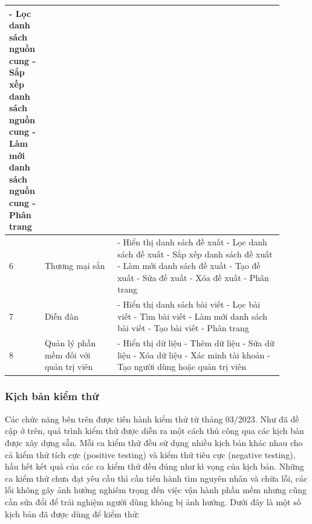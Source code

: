 \documentclass[./../main.tex]{subfiles}
\begin{document}
\begin{longtable}{| p{0.07\linewidth} | p{0.25\linewidth} | p{0.58\linewidth} |}
    - Lọc danh sách nguồn cung \newline
    - Sắp xếp danh sách nguồn cung \newline
    - Làm mới danh sách nguồn cung \newline
    - Phân trang 
\\ \hline
    \centerline{6} & 
    Thương mại sắn &
    - Hiển thị danh sách đề xuất \newline
    - Lọc danh sách đề xuất \newline
    - Sắp xếp danh sách đề xuất \newline
    - Làm mới danh sách đề xuất \newline
    - Tạo đề xuất \newline
    - Sửa đề xuất \newline
    - Xóa đề xuất \newline
    - Phân trang  
\\ \hline
    \centerline{7} & 
    Diễn đàn &
    - Hiển thị danh sách bài viết \newline
    - Lọc bài viết \newline
    - Tìm bài viết \newline
    - Làm mới danh sách bài viết \newline
    - Tạo bài viết \newline
    - Phân trang  
\\ \hline
    \centerline{8} & 
    Quản lý phần mềm đối với quản trị viên &
    - Hiển thị dữ liệu \newline
    - Thêm dữ liệu \newline
    - Sửa dữ liệu \newline
    - Xóa dữ liệu \newline
    - Xác minh tài khoản \newline
    - Tạo người dùng hoặc quản trị viên
\\ \hline
\end{longtable}

\subsubsection{Kịch bản kiểm thử}
Các chức năng bên trên được tiến hành kiểm thử từ tháng 03/2023. Như đã đề cập ở trên, quá trình kiểm thử được diễn ra một cách thủ công qua các kịch bản được xây dựng sẵn. Mỗi ca kiểm thử đều sử dụng nhiều kịch bản khác nhau cho cả kiểm thử tích cực (positive testing) và kiểm thử tiêu cực (negative testing), hầu hết kết quả của các ca kiểm thử đều đúng như kì vọng của kịch bản. Những ca kiểm thử chưa đạt yêu cầu thì cần tiến hành tìm nguyên nhân và chữa lỗi, các lỗi không gây ảnh hưởng nghiêm trọng đến việc vận hành phần mềm nhưng cũng cần sửa đổi để trải nghiệm người dùng không bị ảnh hưởng. Dưới đây là một số kịch bản đã được dùng để kiểm thử:
\clearpage
\end{document}
